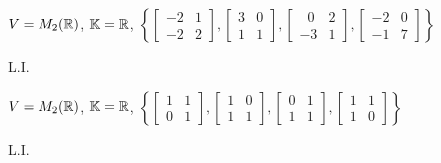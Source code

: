 \documentclass[12pt]{exam}
\begin{document}
    \begin{exercicio}
        $V = M_2(\mathbb{R})$, $\mathbb{K} = \mathbb{R}$,
        $
            \left\{
                \begin{bmatrix}
                    -2 & 1\\
                    -2 & 2
                \end{bmatrix},
                \begin{bmatrix}
                    3 & 0\\
                    1 & 1
                \end{bmatrix},
                \begin{bmatrix}
                    \phantom{x} 0 & 2\\
                    -3 & 1
                \end{bmatrix},
                \begin{bmatrix}
                    -2 & 0\\
                    -1 & 7
                \end{bmatrix}
            \right\}
        $
        \begin{solucao}
            L.I.
        \end{solucao}
    \end{exercicio}

    \begin{exercicio}
        $V = M_2(\mathbb{R})$, $\mathbb{K} = \mathbb{R}$,
        $
            \left\{
                \begin{bmatrix}
                    1 & 1\\
                    0 & 1
                \end{bmatrix},
                \begin{bmatrix}
                    1 & 0\\
                    1 & 1
                \end{bmatrix},
                \begin{bmatrix}
                    0 & 1\\
                    1 & 1
                \end{bmatrix},
                \begin{bmatrix}
                    1 & 1\\
                    1 & 0
                \end{bmatrix}
            \right\}
        $
        \begin{solucao}
            L.I.
        \end{solucao}
    \end{exercicio}
\end{document}
